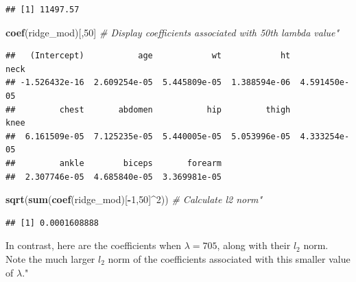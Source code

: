 \documentclass[]{article}
\newenvironment{Shaded}{\begin{snugshade}}{\end{snugshade}}
\newcommand{\KeywordTok}[1]{\textcolor[rgb]{0.13,0.29,0.53}{\textbf{#1}}}
\newcommand{\DecValTok}[1]{\textcolor[rgb]{0.00,0.00,0.81}{#1}}
\newcommand{\CommentTok}[1]{\textcolor[rgb]{0.56,0.35,0.01}{\textit{#1}}}
\newcommand{\OperatorTok}[1]{\textcolor[rgb]{0.81,0.36,0.00}{\textbf{#1}}}
\newcommand{\NormalTok}[1]{#1}
\begin{document}
\begin{Shaded}
\end{Shaded}

\begin{verbatim}
## [1] 11497.57
\end{verbatim}

\begin{Shaded}
\begin{Highlighting}[]
\KeywordTok{coef}\NormalTok{(ridge_mod)[,}\DecValTok{50}\NormalTok{] }\CommentTok{# Display coefficients associated with 50th lambda value"}
\end{Highlighting}
\end{Shaded}

\begin{verbatim}
##   (Intercept)           age            wt            ht          neck 
## -1.526432e-16  2.609254e-05  5.445809e-05  1.388594e-06  4.591450e-05 
##         chest       abdomen           hip         thigh          knee 
##  6.161509e-05  7.125235e-05  5.440005e-05  5.053996e-05  4.333254e-05 
##         ankle        biceps       forearm 
##  2.307746e-05  4.685840e-05  3.369981e-05
\end{verbatim}

\begin{Shaded}
\begin{Highlighting}[]
\KeywordTok{sqrt}\NormalTok{(}\KeywordTok{sum}\NormalTok{(}\KeywordTok{coef}\NormalTok{(ridge_mod)[}\OperatorTok{-}\DecValTok{1}\NormalTok{,}\DecValTok{50}\NormalTok{]}\OperatorTok{^}\DecValTok{2}\NormalTok{)) }\CommentTok{# Calculate l2 norm"}
\end{Highlighting}
\end{Shaded}

\begin{verbatim}
## [1] 0.0001608888
\end{verbatim}

In contrast, here are the coefficients when \(\lambda = 705\), along
with their \(l_2\) norm. Note the much larger \(l_2\) norm of the
coefficients associated with this smaller value of \(\lambda\)."

\begin{Shaded}
\end{Shaded}
\end{document}

